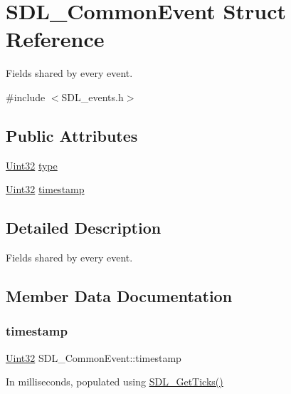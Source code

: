 \hypertarget{struct_s_d_l___common_event}{}\section{S\+D\+L\+\_\+\+Common\+Event Struct Reference}
\label{struct_s_d_l___common_event}


Fields shared by every event.  




{\ttfamily \#include $<$S\+D\+L\+\_\+events.\+h$>$}

\subsection*{Public Attributes}
\begin{DoxyCompactItemize}
\item 
\mbox{\hyperlink{_s_d_l__stdinc_8h_add440eff171ea5f55cb00c4a9ab8672d}{Uint32}} \mbox{\hyperlink{struct_s_d_l___common_event_a4ecd888325355321b42b2e2956f27453}{type}}
\item 
\mbox{\hyperlink{_s_d_l__stdinc_8h_add440eff171ea5f55cb00c4a9ab8672d}{Uint32}} \mbox{\hyperlink{struct_s_d_l___common_event_a7d9046abb021ffc88dd5d32978289e65}{timestamp}}
\end{DoxyCompactItemize}


\subsection{Detailed Description}
Fields shared by every event. 

\subsection{Member Data Documentation}
\mbox{\label{struct_s_d_l___common_event_a7d9046abb021ffc88dd5d32978289e65}} 
\subsubsection{\texorpdfstring{timestamp}{timestamp}}
{\footnotesize\ttfamily \mbox{\hyperlink{_s_d_l__stdinc_8h_add440eff171ea5f55cb00c4a9ab8672d}{Uint32}} S\+D\+L\+\_\+\+Common\+Event\+::timestamp}

In milliseconds, populated using \mbox{\hyperlink{_s_d_l__timer_8h_a0b9bc71d6287e0ffafdc3419760fe2b3}{S\+D\+L\+\_\+\+Get\+Ticks()}} \mbox{\label{struct_s_d_l___common_event_a4ecd888325355321b42b2e2956f27453}} 

